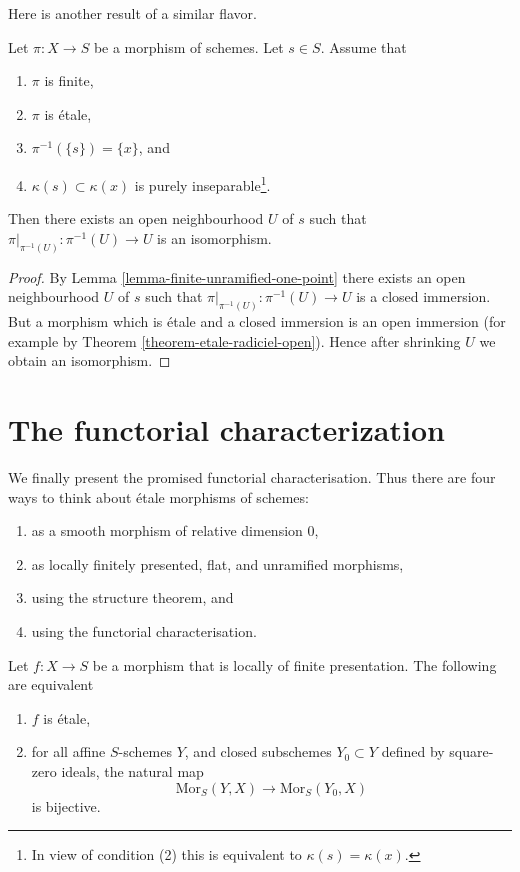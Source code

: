 \noindent
Here is another result of a similar flavor.

\begin{lemma}
\label{lemma-finite-etale-one-point}
Let $\pi : X \to S$ be a morphism of schemes. Let $s \in S$.
Assume that
\begin{enumerate}
\item $\pi$ is finite,
\item $\pi$ is \'etale,
\item $\pi^{-1}(\{s\}) = \{x\}$, and
\item $\kappa(s) \subset \kappa(x)$ is purely
inseparable\footnote{In view of condition (2)
this is equivalent to $\kappa(s) = \kappa(x)$.}.
\end{enumerate}
Then there exists an open neighbourhood $U$ of $s$ such that
$\pi|_{\pi^{-1}(U)} : \pi^{-1}(U) \to U$ is an isomorphism.
\end{lemma}

\begin{proof}
By
Lemma \ref{lemma-finite-unramified-one-point}
there exists an open neighbourhood $U$ of $s$ such that
$\pi|_{\pi^{-1}(U)} : \pi^{-1}(U) \to U$ is a closed immersion.
But a morphism which is \'etale and a closed immersion is an
open immersion (for example by
Theorem \ref{theorem-etale-radiciel-open}).
Hence after shrinking $U$ we obtain an isomorphism.
\end{proof}



\section{The functorial characterization}
\label{section-functorial-etale}

\noindent
We finally present the promised functorial characterisation.
Thus there are four ways to think about \'etale morphisms of schemes:
\begin{enumerate}
\item as a smooth morphism of relative dimension $0$,
\item as locally finitely presented, flat, and unramified morphisms,
\item using the structure theorem, and
\item using the functorial characterisation.
\end{enumerate}

\begin{theorem}
\label{theorem-formally-etale}
Let $f : X \to S$ be a morphism that is locally of finite presentation.
The following are equivalent
\begin{enumerate}
\item $f$ is \'etale,
\item for all affine $S$-schemes $Y$, and closed subschemes $Y_0 \subset Y$
defined by square-zero ideals, the natural map
$$
\text{Mor}_S(Y, X) \longrightarrow \text{Mor}_S(Y_0, X)
$$
is bijective.
\end{enumerate}
\end{theorem}

